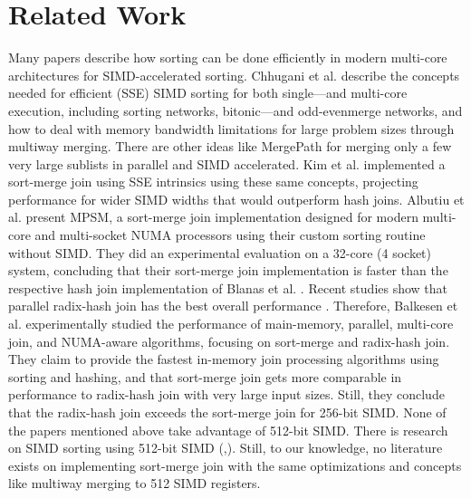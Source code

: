 \section{Related Work}
\label{sec:related-work}


Many papers describe how sorting can be done efficiently in modern multi-core architectures for
SIMD-accelerated sorting. Chhugani et al. \cite{10.14778/1454159.1454171} describe the concepts 
needed for efficient (SSE) SIMD sorting for both single—and multi-core execution, including sorting
networks, bitonic—and odd-evenmerge networks, and how to deal with memory bandwidth limitations 
for large problem sizes through multiway merging. There are other ideas like MergePath \cite{MergePath}
for merging only a few very large sublists in parallel and SIMD accelerated.
Kim et al. \cite{10.14778/1687553.1687564} implemented a sort-merge join using SSE intrinsics using these same 
concepts, projecting performance for wider SIMD widths that would outperform hash joins. Albutiu 
et al. \cite{MPSM} present MPSM, a sort-merge join implementation designed for modern multi-core and
multi-socket NUMA processors using their custom sorting routine without SIMD. They did an
experimental evaluation on a 32-core (4 socket) system, concluding that their sort-merge join
implementation is faster than the respective hash join implementation of Blanas et al. \cite{10.1145/1989323.1989328}. 
Recent studies show that parallel radix-hash join has the best overall performance \cite{6544839}. Therefore,
Balkesen et al. \cite{Balkesen} experimentally studied the performance of main-memory, parallel,
multi-core join, and NUMA-aware algorithms, focusing on sort-merge and radix-hash join.
They claim to provide the fastest in-memory join processing algorithms using sorting and hashing,
and that sort-merge join gets more comparable in performance to radix-hash join with very large 
input sizes. Still, they conclude that the radix-hash join exceeds the sort-merge join for 256-bit
SIMD. None of the papers mentioned above take advantage of 512-bit SIMD. There is research on SIMD
sorting using 512-bit SIMD (\cite{Watkins},\cite{8855628}). Still, to our knowledge, no literature 
exists on implementing sort-merge join with the same optimizations and concepts like
multiway merging to 512 SIMD registers.

